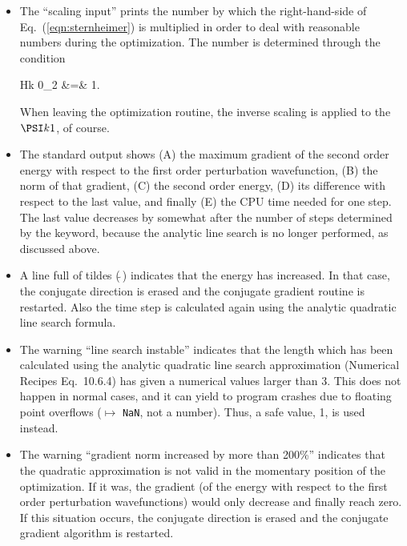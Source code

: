 \documentclass[twoside,10pt,titlepage,a4paper]{article}
\begin{document}
\begin{itemize}
\item
The ``scaling input'' prints the number by which the right-hand-side
of Eq.~(\ref{eqn:sternheimer}) is multiplied in order to deal with
reasonable numbers during the optimization. The number is determined
through the condition

\beq
  \vert\vert\;H\one \PSI k 0\;\vert\vert_2 &=& 1.
\eeq

When leaving the optimization routine, the inverse scaling is applied
to the $\PSI k 1$, of course.

\item
The standard output shows (A) the maximum gradient of the second order
energy with respect to the first order perturbation wavefunction, (B)
the norm of that gradient, (C) the second order energy, (D) its
difference with respect to the last value, and finally (E) the CPU
time needed for one step. The last value decreases by somewhat after
the number of steps determined by the {} keyword,
because the analytic line search is no longer performed, as discussed
                above.

\item
A line full of tildes ($\tilde{\ }$) indicates that the energy has
increased. In that case, the conjugate direction is erased and the
conjugate gradient routine is restarted. Also the time step is
calculated again using the analytic quadratic line search formula.

\item
The warning ``line search instable'' indicates that the length which
has been calculated using the analytic quadratic line search
approximation (Numerical Recipes Eq.~10.6.4) has given a numerical
values larger than 3. This does not happen in normal cases, and it can
yield to program crashes due to floating point overflows ($\mapsto$
{\tt NaN}, not a number). Thus, a safe value, 1, is used instead.

\item
The warning ``gradient norm increased by more than 200\%'' indicates
that the quadratic approximation is not valid in the momentary
position of the optimization. If it was, the gradient (of the energy
with respect to the first order perturbation wavefunctions) would only
decrease and finally reach zero. If this situation occurs, the
conjugate direction is erased and the conjugate gradient algorithm is
restarted.
\end{itemize}
\end{document}
